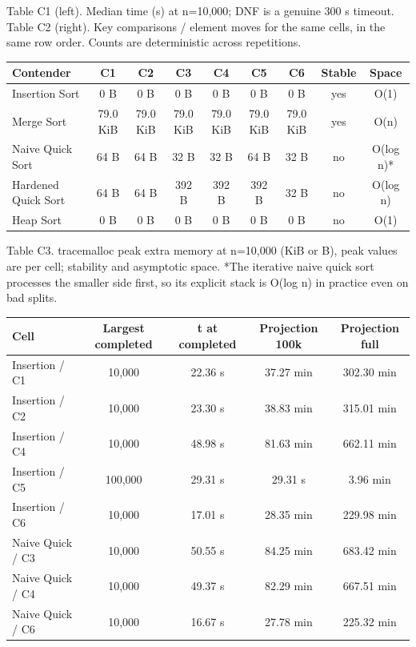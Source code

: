 \documentclass[10pt,a4paper]{article}
\newcommand{\figcaption}[1]{%
  \par\vspace{2pt}%
  {\fontsize{6.8}{8.1}\selectfont\color{muted}#1}%
  \par\vspace{2pt}%
}
\begin{document}
\figcaption{Table C1 (left). Median time (s) at n=10,000; DNF is a genuine
300 s timeout. Table C2 (right). Key comparisons / element moves for the same
cells, in the same row order. Counts are deterministic across repetitions.}

{\fontsize{6.6}{7.9}\selectfont
\renewcommand{\arraystretch}{1.10}
\begin{tabularx}{\linewidth}{@{}L{2.1}C{0.85}C{0.85}C{0.85}C{0.85}C{0.85}C{0.85}C{0.9}C{0.9}@{}}
\toprule{}
\textbf{Contender} & \textbf{C1} & \textbf{C2} & \textbf{C3} & \textbf{C4} & \textbf{C5} & \textbf{C6} & \textbf{Stable} & \textbf{Space} \\
\midrule
Insertion Sort & 0 B & 0 B & 0 B & 0 B & 0 B & 0 B & yes & O(1) \\
Merge Sort & 79.0 KiB & 79.0 KiB & 79.0 KiB & 79.0 KiB & 79.0 KiB & 79.0 KiB & yes & O(n) \\
Naive Quick Sort & 64 B & 64 B & 32 B & 32 B & 64 B & 32 B & no & O(log n)* \\
Hardened Quick Sort & 64 B & 64 B & 392 B & 392 B & 392 B & 32 B & no & O(log n) \\
Heap Sort & 0 B & 0 B & 0 B & 0 B & 0 B & 0 B & no & O(1) \\
\bottomrule
\end{tabularx}}\par\vspace{0.5pt}

\figcaption{Table C3. tracemalloc peak extra memory at n=10,000 (KiB or B),
peak values are per cell; stability and asymptotic space. *The iterative naive
quick sort processes the smaller side first, so its explicit stack is O(log n)
in practice even on bad splits.}

{\fontsize{6.7}{8.0}\selectfont
\renewcommand{\arraystretch}{1.06}
\begin{tabularx}{\linewidth}{@{}L{1.6}C{0.85}C{0.85}C{0.85}C{0.85}@{}}
\toprule{}
\textbf{Cell} & \textbf{Largest completed} & \textbf{t at completed} & \textbf{Projection 100k} & \textbf{Projection full} \\
\midrule
Insertion / C1 & 10,000 & 22.36 s & 37.27 min & 302.30 min \\
Insertion / C2 & 10,000 & 23.30 s & 38.83 min & 315.01 min \\
Insertion / C4 & 10,000 & 48.98 s & 81.63 min & 662.11 min \\
Insertion / C5 & 100,000 & 29.31 s & 29.31 s & 3.96 min \\
Insertion / C6 & 10,000 & 17.01 s & 28.35 min & 229.98 min \\
Naive Quick / C3 & 10,000 & 50.55 s & 84.25 min & 683.42 min \\
Naive Quick / C4 & 10,000 & 49.37 s & 82.29 min & 667.51 min \\
Naive Quick / C6 & 10,000 & 16.67 s & 27.78 min & 225.32 min \\
\bottomrule
\end{tabularx}}\par\vspace{0.5pt}
\end{document}
